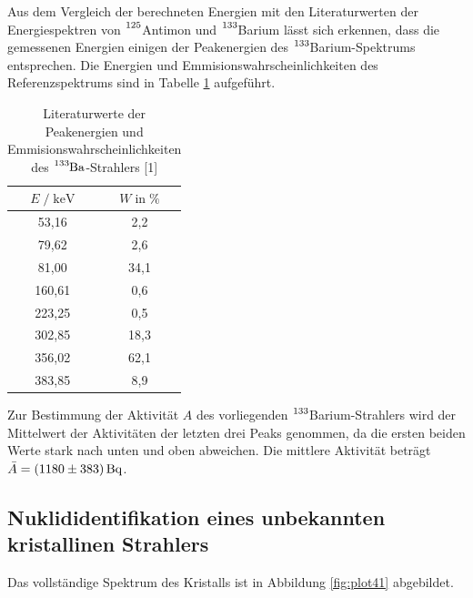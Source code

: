 Aus dem Vergleich der berechneten Energien mit den Literaturwerten der Energiespektren von $\ce{^{125}}$Antimon und 
$\ce{^{133}}$Barium lässt sich erkennen, dass die gemessenen Energien einigen der Peakenergien des
$\ce{^{133}}$Barium-Spektrums entsprechen. Die Energien und Emmisionswahrscheinlichkeiten des Referenzspektrums 
sind in Tabelle \ref{tab:mess6} aufgeführt. \\

\begin{table}
  \centering
  \caption{Literaturwerte der Peakenergien und Emmisionswahrscheinlichkeiten des $\ce{^{133}Ba}$-Strahlers [1]}
  \label{tab:mess6}
  \begin{tabular}{c c}
  \toprule
  $E \;/\; \si{\kilo\eV}$ & $W \;\text{in}\; \si{\percent}$ \\
  \midrule
     53,16 &  2,2 \\
     79,62 &  2,6 \\
     81,00 & 34,1 \\
    160,61 &  0,6 \\
    223,25 &  0,5 \\
    302,85 & 18,3 \\
    356,02 & 62,1 \\
    383,85 &  8,9 \\
  \bottomrule
  \end{tabular}
\end{table}

Zur Bestimmung der Aktivität $A$ des vorliegenden $\ce{^{133}}$Barium-Strahlers wird der Mittelwert der Aktivitäten der letzten drei
Peaks genommen, da die ersten beiden Werte stark nach unten und oben abweichen.
Die mittlere Aktivität beträgt $\bar{A} = \SI{1180 +- 383}{\becquerel}$.


\subsection{Nuklididentifikation %
            eines unbekannten kristallinen Strahlers}

Das vollständige Spektrum des Kristalls ist in Abbildung \ref{fig:plot41} abgebildet.

